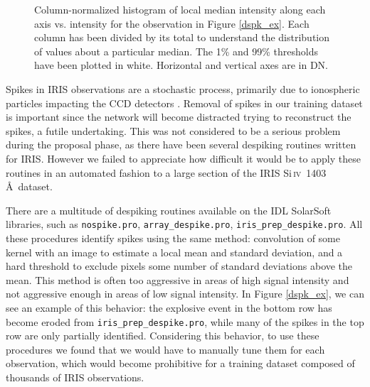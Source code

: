 \documentclass[10pt,letterpaper]{article}
\newcommand{\SiIV}{Si\,\textsc{iv}~1403\,\AA}
\begin{document}
\begin{figure}[t!]
				\caption{Column-normalized histogram of local median intensity along each axis vs. intensity for the observation in Figure \ref{dspk_ex}.
					Each column has been divided by its total to understand the distribution of values about a particular median.
					The 1\% and 99\% thresholds have been plotted in white.
					Horizontal and vertical axes are in DN.}
				
				\label{dspk_hist}
				
			\end{figure}
			
			Spikes in IRIS observations are a stochastic process, primarily due to ionospheric particles impacting the CCD detectors \citep{itn15}.
			Removal of spikes in our training dataset is important since the network will become distracted trying to reconstruct the spikes, a futile undertaking.
			This was not considered to be a serious problem during the proposal phase, as there have been several despiking routines written for IRIS.
			However we failed to appreciate how difficult it would be to apply these routines in an automated fashion to a large section of the IRIS \SiIV\ dataset.
			
			There are a multitude of despiking routines available on the IDL SolarSoft libraries, such as \texttt{nospike.pro}, \texttt{array\_despike.pro}, \texttt{iris\_prep\_despike.pro}.
			All these procedures identify spikes using the same method: convolution of some kernel with an image to estimate a local mean and standard deviation, and a hard threshold to exclude pixels some number of standard deviations above the mean.
			This method is often too aggressive in areas of high signal intensity and not aggressive enough in areas of low signal intensity.
			In Figure \ref{dspk_ex}, we can see an example of this behavior: the explosive event in the bottom row has become eroded from \texttt{iris\_prep\_despike.pro}, while many of the spikes in the top row are only partially identified.
			Considering this behavior, to use these procedures we found that we would have to manually tune them for each observation, which would become prohibitive for a training dataset composed of thousands of IRIS observations.
			
\end{document}

